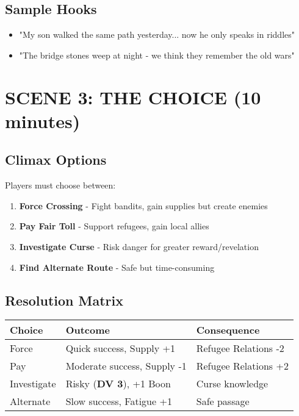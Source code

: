 \documentclass[12pt]{article}
\newcommand{\dv}[1]{\textbf{DV #1}}
\begin{document}
\subsection*{Sample Hooks}
\begin{itemize}
\item "My son walked the same path yesterday... now he only speaks in riddles"
\item "The bridge stones weep at night - we think they remember the old wars"
\end{itemize}

\section{SCENE 3: THE CHOICE (10 minutes)}

\subsection*{Climax Options}
Players must choose between:
\begin{enumerate}
\item \textbf{Force Crossing} - Fight bandits, gain supplies but create enemies
\item \textbf{Pay Fair Toll} - Support refugees, gain local allies  
\item \textbf{Investigate Curse} - Risk danger for greater reward/revelation
\item \textbf{Find Alternate Route} - Safe but time-consuming
\end{enumerate}

\subsection*{Resolution Matrix}
\begin{center}
\begin{tabularx}{\textwidth}{|l|l|l|}
\hline
\textbf{Choice} & \textbf{Outcome} & \textbf{Consequence} \\
\hline
Force & Quick success, Supply +1 & Refugee Relations -2 \\
\hline
Pay & Moderate success, Supply -1 & Refugee Relations +2 \\
\hline
Investigate & Risky (\dv{3}), +1 Boon & Curse knowledge \\
\hline
Alternate & Slow success, Fatigue +1 & Safe passage \\
\hline
\end{tabularx}
\end{center}
\end{document}
